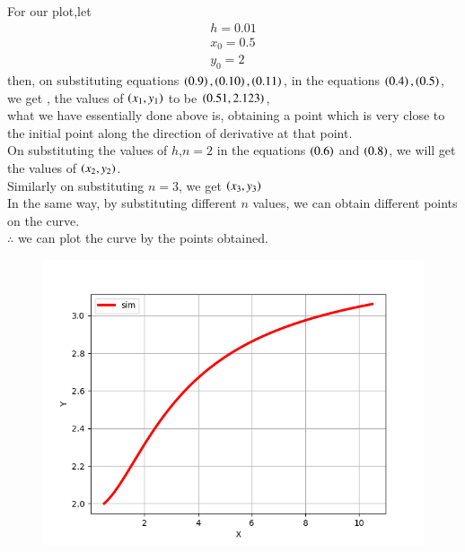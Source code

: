 \documentclass[journal]{IEEEtran}
\begin{document}
For our plot,let
\begin{align}
    h = 0.01\\
    x_0 = 0.5\\
    y_0 = 2
\end{align}
then, on substituting equations $\left(0.9\right),\left(0.10\right),\left(0.11\right)$, in the equations $\left(0.4\right),\left(0.5\right)$, we get ,
the values of $\left(x_1,y_1\right)$ to be $\left(0.51,2.123\right)$,\\
what we have essentially done above is, obtaining a point which is very close to the initial point along the direction of derivative at that point.\\
On substituting the values of $h$,$n = 2$ in the equations $\left(0.6\right)$ and $\left(0.8\right)$, we  will get the values of $\left(x_2,y_2\right)$. \\
Similarly on substituting $n=3$, we get $\left(x_3,y_3\right)$ \\
In the same way, by substituting different $n$ values, we can obtain different points on the curve.\\
 $\therefore$ we can plot the curve by the points obtained.
\begin{figure}[h!]
   \centering
   \includegraphics[width=0.75\columnwidth]{figures/Figure_1.png}
\end{figure}
\end{document}
